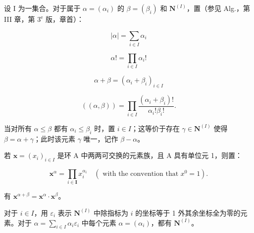 
设 I 为一集合。对于属于 \(\alpha = (\alpha_{i})\) 的 \(\beta = (\beta_{i})\) 和 \(\mathbf{N}^{(I)}\)，置（参见 Alg.，第 III 章，第 \(3^{\mathrm{e}}\) 版，章首）：

\[
| \alpha | = \sum_ {i \in I} \alpha_ {i}
\]

\[
\alpha ! = \prod_ {i \in I} \alpha_ {i}!
\]

\[
\alpha + \beta = (\alpha_ {i} + \beta_ {i}) _ {i \in I}
\]

\[
((\alpha , \beta)) = \prod_ {i \in I} \frac {(\alpha_ {i} + \beta_ {i}) !}{\alpha_ {i} ! \beta_ {i} !}.
\]

当对所有 \(\alpha \leqslant \beta\) 都有 \(\alpha_{i} \leqslant \beta_{i}\) 时，置 \(i \in I\)；这等价于存在 \(\gamma \in \mathbf{N}^{(I)}\) 使得 \(\beta = \alpha + \gamma\)；此时该元素 \(\gamma\) 唯一，记作 \(\beta - \alpha\)。

若 \(\mathbf{x} = (x_i)_{i \in I}\) 是环 A 中两两可交换的元素族，且 A 具有单位元 1，则置：

\[
\mathbf {x} ^ {\alpha} = \prod_ {i \in \mathbf {I}} x _ {i} ^ {\alpha_ {i}} \quad (\text { with   the   convention   that } x ^ {0} = 1).
\]

有 \(\mathbf{x}^{\alpha +\beta} = \mathbf{x}^{\alpha}\cdot \mathbf{x}^{\beta}\)。

对于 \(i\in I\)，用 \(\varepsilon_{i}\) 表示 \(\mathbf{N}^{(I)}\) 中除指标为 \(i\) 的坐标等于 1 外其余坐标全为零的元素。对于 \(\alpha=\sum_{i\in I}\alpha_{i}\varepsilon_{i}\) 中每个元素 \(\alpha=(\alpha_{i})\)，都有 \(\mathbf{N}^{(I)}\)。


